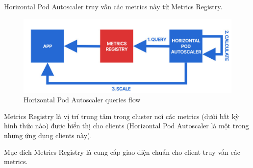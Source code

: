 Horizontal Pod Autoscaler truy vấn các metrics này từ Metrics Registry.
\begin{figure}[H]
  \begin{center}
    \includegraphics[scale=0.65]{images/phat/metrics_registry.jpg}
    \caption{Horizontal Pod Autoscaler queries flow}
  \end{center}
\end{figure}
Metrics Registry là vị trí trung tâm trong cluster nơi các metrics (dưới bất kỳ hình thức nào) được hiển thị cho clients (Horizontal Pod Autoscaler là một trong những ứng dụng clients này).

Mục đích Metrics Registry là cung cấp giao diện chuẩn cho client truy vấn các metrics.

